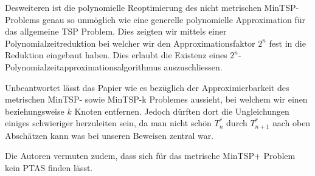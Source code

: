 \documentclass[12pt]{article}
\begin{document}
	Desweiteren ist die polynomielle Reoptimierung des nicht metrischen MinTSP- Problems genau so unmöglich wie eine generelle polynomielle Approximation für das allgemeine TSP Problem. Dies zeigten wir mittels einer Polynomialzeitreduktion bei welcher wir den Approximationsfaktor $2^n$ fest in die Reduktion eingebaut haben. Dies erlaubt die Existenz eines $2^n$-Polynomialzeitapproximationsalgorithmus auszuschliessen.
	
	Unbeantwortet lässt das Papier wie es bezüglich der Approximierbarkeit des metrischen MinTSP- sowie \mbox{MinTSP-k} Problemes aussieht, bei welchem wir einen beziehungsweise $k$ Knoten entfernen. Jedoch dürften dort die Ungleichungen einiges schwieriger herzuleiten sein, da man nicht schön $T_n^*$ durch $T_{n+1}^*$ nach oben Abschätzen kann was bei unseren Beweisen zentral war.
	
	Die Autoren vermuten zudem, dass sich für das metrische MinTSP+ Problem kein PTAS finden lässt.
	
	\printbibliography
	
	
\end{document}
